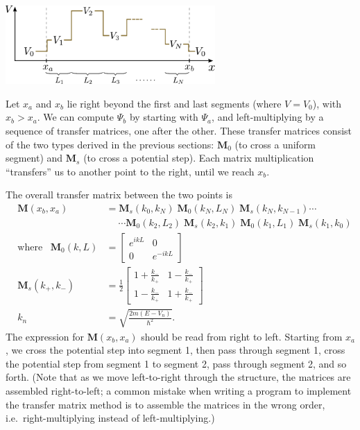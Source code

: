 \documentclass[pra,12pt]{revtex4}
\begin{document}
\begin{center}
  \includegraphics[width=0.6\textwidth]{transfer_matrix_setup2}
\end{center}

\noindent
Let $x_a$ and $x_b$ lie right beyond the first and last segments
(where $V = V_0$), with $x_b > x_a$.  We can compute $\Psi_b$ by
starting with $\Psi_a$, and left-multiplying by a sequence of transfer
matrices, one after the other.  These transfer matrices consist of the
two types derived in the previous sections: $\mathbf{M}_0$ (to cross a
uniform segment) and $\mathbf{M}_s$ (to cross a potential step).  Each
matrix multiplication ``transfers'' us to another point to the right,
until we reach $x_b$.

The overall transfer matrix between the two points is
\begin{equation}
  \boxed{\;\;\;\begin{aligned}\mathbf{M}(x_b, x_a) &= \mathbf{M}_s(k_0,k_N)\; \mathbf{M}_0(k_N,L_N) \; \mathbf{M}_s(k_N, k_{N-1}) \cdots \\ & \quad\;\cdots \mathbf{M}_0(k_2,L_2) \; \mathbf{M}_s(k_2, k_1) \; \mathbf{M}_0(k_1,L_1) \; \mathbf{M}_s(k_1,k_0) \;\;\;\\ \mathrm{where}\;\;\; \mathbf{M}_0(k,L) &= \begin{bmatrix}e^{ikL} & 0 \\ 0 & e^{-ikL}\end{bmatrix} \\ \mathbf{M}_s(k_+,k_-) &= \frac{1}{2} \begin{bmatrix}1+\frac{k_-}{k_+} & 1-\frac{k_-}{k_+} \\ 1-\frac{k_-}{k_+} & 1+\frac{k_-}{k_+}\end{bmatrix}\\ k_n &= \sqrt{\frac{2m(E-V_n)}{\hbar^2}}.\end{aligned}}
\end{equation}
The expression for $\mathbf{M}(x_b,x_a)$ should be read from right to
left.  Starting from $x_a$, we cross the potential step into segment
1, then pass through segment 1, cross the potential step from segment
1 to segment 2, pass through segment 2, and so forth.  (Note that as
we move left-to-right through the structure, the matrices are
assembled right-to-left; a common mistake when writing a program to
implement the transfer matrix method is to assemble the matrices in
the wrong order, i.e.~right-multiplying instead of left-multiplying.)
\end{document}
